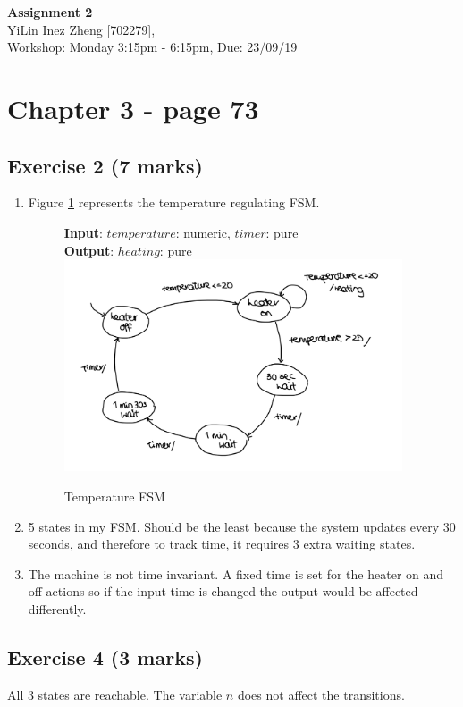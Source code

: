 \documentclass[11pt]{article}
\begin{document}

\clearpage
\setcounter{page}{1}

\begin{center}
\textbf{\Large{Assignment 2}}\\
YiLin Inez Zheng [702279], \\
Workshop: Monday 3:15pm - 6:15pm, Due: 23/09/19  
\end{center}

\section*{Chapter 3 - page 73}
\subsection*{Exercise 2 (7 marks)}
\begin{enumerate}[label=\alph*)]
    \item %
    Figure \ref{fig:Ch3Ex2} represents the temperature regulating FSM.
    \begin{figure}[H]
    \centering
    \textbf{Input}: $temperature$: numeric, $timer$: pure\\
    \textbf{Output}: $heating$: pure\\
    \includegraphics[width=10cm]{Ch3Ex2.jpeg}
    \caption{Temperature FSM}
    \label{fig:Ch3Ex2}
    \end{figure}
    \item %
    5 states in my FSM. Should be the least because the system updates every 30 seconds, and therefore to track time, it requires 3 extra waiting states.  
    \item %
    The machine is not time invariant. A fixed time is set for the heater on and off actions so if the input time is changed the output would be affected differently. 
\end{enumerate}
\subsection*{Exercise 4 (3 marks)}
All 3 states are reachable. The variable $n$ does not affect the transitions.
\end{document}
